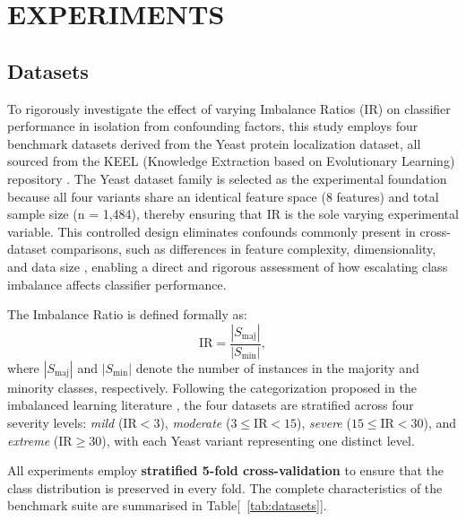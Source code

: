 \documentclass[sigconf]{acmart}
\begin{document}
\section{EXPERIMENTS}
\subsection{Datasets}

To rigorously investigate the effect of varying Imbalance Ratios (IR) on classifier performance in isolation from confounding factors, this study employs four benchmark datasets derived from the Yeast protein localization dataset, all sourced from the KEEL (Knowledge Extraction based on Evolutionary Learning) repository \cite{31}. The Yeast dataset family is selected as the experimental foundation because all four variants share an identical feature space (8 features) and total sample size (n = 1,484), thereby ensuring that IR is the sole varying experimental variable. This controlled design eliminates confounds commonly present in cross-dataset comparisons, such as differences in feature complexity, dimensionality, and data size \cite{8}, enabling a direct and rigorous assessment of how escalating class imbalance affects classifier performance. 


The Imbalance Ratio is defined formally as:
%
\begin{equation}
  \mathrm{IR} = \frac{|S_{\mathrm{maj}}|}{|S_{\mathrm{min}}|},
  \label{eq:IR}
\end{equation}
%
where $|S_{\mathrm{maj}}|$ and $|S_{\mathrm{min}}|$ denote the number of instances in the majority and minority classes, respectively. Following the categorization proposed in the imbalanced learning literature \cite{1}, the four datasets are stratified across four severity levels:
 \emph{mild} ($\mathrm{IR} < 3$), \emph{moderate}
($3 \le \mathrm{IR} < 15$), \emph{severe} ($15 \le \mathrm{IR} < 30$),
and \emph{extreme} ($\mathrm{IR} \ge 30$), with each Yeast variant representing one distinct level.

All experiments employ \textbf{stratified 5-fold cross-validation} to
ensure that the class distribution is preserved in every fold.
The complete characteristics of the benchmark suite are summarised in
Table[~\ref{tab:datasets}].
\end{document}
